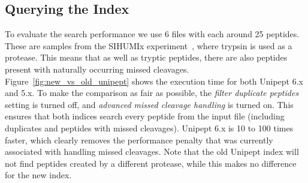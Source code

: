 \documentclass[11pt]{article}
\newenvironment{Figure}
{\par\medskip\noindent\minipage{\linewidth}}
{\endminipage\par\medskip}
\begin{document}
\begin{multicols}{2}
        \subsection{Querying the Index}
        To evaluate the search performance we use 6 files with each around 25 peptides.
        These are samples from the SIHUMIx experiment~\cite{SIHUMI_frequently_used, SIHUMI_first_introduction}, where trypsin is used as a protease.
        This means that as well as tryptic peptides, there are also peptides present with naturally occurring missed cleavages.
        Figure~\ref{fig:new_vs_old_unipept} shows the execution time for both Unipept 6.x and 5.x.
        To make the comparison as fair as possible, the \textit{filter duplicate peptides} setting is turned off, and \textit{advanced missed cleavage handling} is turned on.
        This ensures that both indices search every peptide from the input file (including duplicates and peptides with missed cleavages).
        Unipept 6.x is 10 to 100 times faster, which clearly removes the performance penalty that was currently associated with handling missed cleavages.
        Note that the old Unipept index will not find peptides created by a different protease, while this makes no difference for the new index.
        \begin{Figure}
            \centering
\end{Figure}
\end{multicols}
\end{document}
